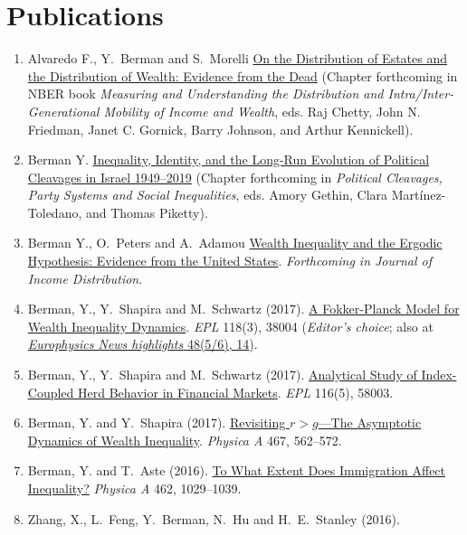 \documentclass[10pt]{article}
\begin{document}
\section*{Publications}

\begin{enumerate}%
\item Alvaredo F., Y.~Berman and S.~Morelli \href{http://bit.ly/ABM_NBER}{On the Distribution of Estates and the Distribution of Wealth: Evidence from the Dead} (Chapter forthcoming in NBER book \textit{Measuring and Understanding the Distribution and Intra/Inter-Generational Mobility of Income and Wealth}, eds. Raj Chetty, John N. Friedman, Janet C. Gornick, Barry Johnson, and Arthur Kennickell).
\item Berman Y. \href{http://bit.ly/IsraelPoliticalCleavages}{Inequality, Identity, and the Long-Run Evolution of Political Cleavages in Israel 1949--2019} (Chapter forthcoming in \textit{Political Cleavages, Party Systems and Social Inequalities}, eds. Amory Gethin, Clara Mart\'{i}nez-Toledano, and Thomas Piketty).
\item Berman Y., O.~Peters and A.~Adamou \href{http://bit.ly/2pVXfH8}{Wealth Inequality and the Ergodic Hypothesis: Evidence from the United States}. \textit{Forthcoming in Journal of Income Distribution}.
\item Berman, Y.,  Y.~Shapira and M.~Schwartz (2017).
  \href{http://iopscience.iop.org/article/10.1209/0295-5075/118/38004/meta}{A Fokker-Planck Model for Wealth Inequality Dynamics}.
  \textit{EPL} 118(3), 38004 (\textit{Editor's choice}; also at \href{http://www.europhysicsnews.org/articles/epn/pdf/2017/05/epn2017-48-5-6.pdf}{\textit{Europhysics News highlights} 48(5/6), 14}).
\item Berman, Y.,  Y.~Shapira and M.~Schwartz (2017).
  \href{http://iopscience.iop.org/article/10.1209/0295-5075/116/58003/meta}{Analytical Study of Index-Coupled Herd Behavior in Financial Markets}.
  \textit{EPL} 116(5), 58003.
\item Berman, Y. and Y.~Shapira (2017).
  \href{http://www.sciencedirect.com/science/article/pii/S0378437116307221}{Revisiting $r > g$---The Asymptotic Dynamics of Wealth Inequality}.
  \textit{Physica A} 467, 562--572.
\item Berman, Y. and T.~Aste (2016).
  \href{http://www.sciencedirect.com/science/article/pii/S0378437116303429}{To What Extent Does Immigration Affect Inequality?}
  \textit{Physica A} 462, 1029--1039.
\item Zhang, X., L.~Feng, Y.~Berman, N.~Hu and H.~E.~Stanley (2016).

\end{enumerate}
\end{document}

